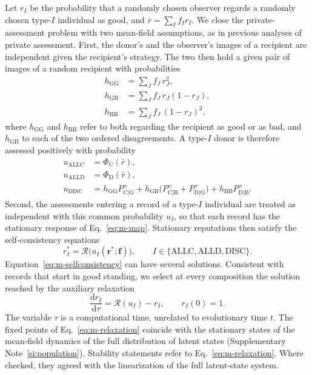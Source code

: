 \documentclass[10pt]{wlscirep}
\newcommand{\Rmap}{\mathscr{R}}            %
\newcommand{\Pp}[1]{P^{+}_{\mathrm{#1}}}   %
\newcommand{\PhiC}{\Phi_{\mathrm{C}}}
\newcommand{\PhiD}{\Phi_{\mathrm{D}}}
\newcommand{\dd}{\mathrm{d}}
\newcommand{\ALLC}{\mathrm{ALLC}}
\newcommand{\ALLD}{\mathrm{ALLD}}
\newcommand{\DISC}{\mathrm{DISC}}
\theoremstyle{plain}
\theoremstyle{remark}
\begin{document}
Let $r_I$ be the probability that a randomly chosen observer regards a randomly chosen type-$I$ individual as good, and $\bar r=\sum_If_Ir_I$. We close the private-assessment problem with two mean-field assumptions, as in previous analyses of private assessment\cite{okada2018,radzvilavicius2019,kessinger2023,michelmata2024,kawakatsu2024}. First, the donor's and the observer's images of a recipient are independent given the recipient's strategy. The two then hold a given pair of images of a random recipient with probabilities
\begin{equation}
\begin{aligned}
h_{\mathrm{GG}}&=\sum_Jf_J\,r_J^2,\\
h_{\mathrm{GB}}&=\sum_Jf_J\,r_J(1-r_J),\\
h_{\mathrm{BB}}&=\sum_Jf_J\,(1-r_J)^2,
\end{aligned}
\label{eq:m-h}
\end{equation}
where $h_{\mathrm{GG}}$ and $h_{\mathrm{BB}}$ refer to both regarding the recipient as good or as bad, and $h_{\mathrm{GB}}$ to each of the two ordered disagreements. A type-$I$ donor is therefore assessed positively with probability
\begin{equation}
\begin{aligned}
u_{\ALLC}&=\PhiC(\bar r),\\
u_{\ALLD}&=\PhiD(\bar r),\\
u_{\DISC}&=h_{\mathrm{GG}}\Pp{C|G}+h_{\mathrm{GB}}\bigl(\Pp{C|B}+\Pp{D|G}\bigr)+h_{\mathrm{BB}}\Pp{D|B}.
\end{aligned}
\label{eq:m-u}
\end{equation}
Second, the assessments entering a record of a type-$I$ individual are treated as independent with this common probability $u_I$, so that each record has the stationary response of Eq.~\eqref{eq:m-map}. Stationary reputations then satisfy the self-consistency equations
\begin{equation}
r_I^*=\Rmap\bigl(u_I(\bm r^*;\bm f)\bigr),\qquad I\in\{\ALLC,\ALLD,\DISC\}.
\label{eq:m-selfconsistency}
\end{equation}
Equation~\eqref{eq:m-selfconsistency} can have several solutions. Consistent with records that start in good standing, we select at every composition the solution reached by the auxiliary relaxation
\begin{equation}
\frac{\dd r_I}{\dd\tau}=\Rmap(u_I)-r_I,\qquad r_I(0)=1.
\label{eq:m-relaxation}
\end{equation}
The variable $\tau$ is a computational time, unrelated to evolutionary time $t$. The fixed points of Eq.~\eqref{eq:m-relaxation} coincide with the stationary states of the mean-field dynamics of the full distribution of latent states (Supplementary Note~\ref{si:population}). Stability statements refer to Eq.~\eqref{eq:m-relaxation}. Where checked, they agreed with the linearization of the full latent-state system.
\end{document}
